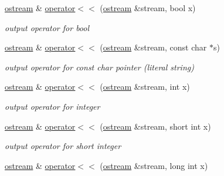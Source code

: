 \begin{DoxyCompactItemize}
\item 
\hyperlink{classhwlib_1_1ostream}{ostream} \& \hyperlink{classhwlib_1_1ostream_a253a2e284130cc22d3dff3fbf669afae}{operator$<$$<$} (\hyperlink{classhwlib_1_1ostream}{ostream} \&stream, bool x)\hypertarget{classhwlib_1_1ostream_a253a2e284130cc22d3dff3fbf669afae}{}\label{classhwlib_1_1ostream_a253a2e284130cc22d3dff3fbf669afae}

\begin{DoxyCompactList}\small\item\em output operator for bool \end{DoxyCompactList}\item 
\hyperlink{classhwlib_1_1ostream}{ostream} \& \hyperlink{classhwlib_1_1ostream_a45bbf00f11c411f55e5eef9b28165fa6}{operator$<$$<$} (\hyperlink{classhwlib_1_1ostream}{ostream} \&stream, const char $\ast$s)\hypertarget{classhwlib_1_1ostream_a45bbf00f11c411f55e5eef9b28165fa6}{}\label{classhwlib_1_1ostream_a45bbf00f11c411f55e5eef9b28165fa6}

\begin{DoxyCompactList}\small\item\em output operator for const char pointer (literal string) \end{DoxyCompactList}\item 
\hyperlink{classhwlib_1_1ostream}{ostream} \& \hyperlink{classhwlib_1_1ostream_a28ee741656d0ad9d6a1782823212e7d9}{operator$<$$<$} (\hyperlink{classhwlib_1_1ostream}{ostream} \&stream, int x)\hypertarget{classhwlib_1_1ostream_a28ee741656d0ad9d6a1782823212e7d9}{}\label{classhwlib_1_1ostream_a28ee741656d0ad9d6a1782823212e7d9}

\begin{DoxyCompactList}\small\item\em output operator for integer \end{DoxyCompactList}\item 
\hyperlink{classhwlib_1_1ostream}{ostream} \& \hyperlink{classhwlib_1_1ostream_a5f10f89fa98ac5e5f89cc2af0e9b0b6e}{operator$<$$<$} (\hyperlink{classhwlib_1_1ostream}{ostream} \&stream, short int x)\hypertarget{classhwlib_1_1ostream_a5f10f89fa98ac5e5f89cc2af0e9b0b6e}{}\label{classhwlib_1_1ostream_a5f10f89fa98ac5e5f89cc2af0e9b0b6e}

\begin{DoxyCompactList}\small\item\em output operator for short integer \end{DoxyCompactList}\item 
\hyperlink{classhwlib_1_1ostream}{ostream} \& \hyperlink{classhwlib_1_1ostream_af269c1256dc5c755fafc13a7b9125187}{operator$<$$<$} (\hyperlink{classhwlib_1_1ostream}{ostream} \&stream, long int x)\hypertarget{classhwlib_1_1ostream_af269c1256dc5c755fafc13a7b9125187}{}\label{classhwlib_1_1ostream_af269c1256dc5c755fafc13a7b9125187}


\end{DoxyCompactItemize}
